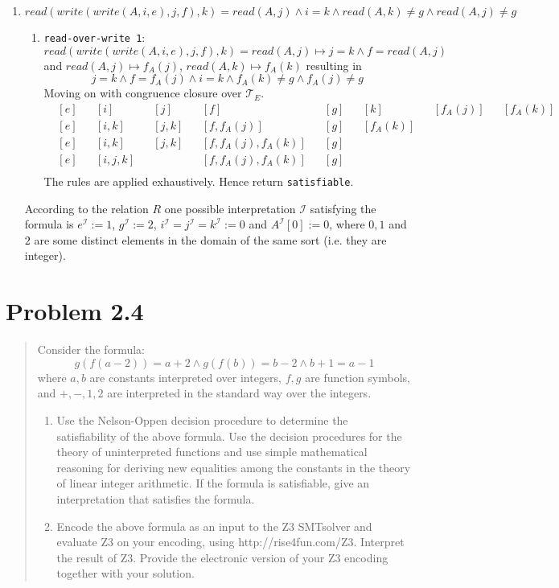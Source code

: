 \documentclass[11pt,a4paper]{article}
\begin{document}
\begin{enumerate}
\item $read(write(write(A, i, e), j, f ), k) = read(A, j) \land i = k \land read(A, k) \neq g \land read(A, j) \neq g$
\begin{enumerate}
\item \texttt{read-over-write 1}: \\
$read(write(write(A, i, e), j, f ), k) = read(A, j) \mapsto j=k \land f = read(A, j)$ and $read(A,j) \mapsto f_A(j)$, $read(A,k) \mapsto f_A(k)$ resulting in 
\begin{equation*}
 j=k \land f = f_A(j) \land i = k \land f_A(k) \neq g \land f_A(j) \neq g
\end{equation*}
Moving on with congruence closure over $\mathcal{T}_E$.
\begin{align*}
&[e]& &[i]& &[j]& &[f]& &[g]& &[k]& &[f_A(j)]& &[f_A(k)]& \\  
&[e]& &[i,k]& &[j,k]& &[f,f_A(j)]& &[g]& &[f_A(k)]& && &&\\  
&[e]& &[i,k]& &[j,k]& &[f,f_A(j),f_A(k)]& &[g]& && && &&\\  
&[e]& &[i,j,k]& &&  &[f,f_A(j),f_A(k)]& &[g]& &&  &&\\  
\end{align*}
The rules are applied exhaustively. Hence return \texttt{satisfiable}.
\end{enumerate}
According to the relation $R$ one possible interpretation $\mathcal{I}$ satisfying the formula is 
$e^{\mathcal{I}}:=1$, $g^{\mathcal{I}}:=2$, $i^{\mathcal{I}}=j^{\mathcal{I}}=k^{\mathcal{I}}:=0$ and $A^{\mathcal{I}}[0]:=0$, where $0,1$ and $2$ are some distinct elements in the domain of the same sort (i.e. they are integer). 
\end{enumerate}


\section*{Problem 2.4}
\begin{quote}
Consider the formula:
\begin{equation*}
g(f (a - 2)) = a + 2 \land g(f (b)) = b - 2 \land b + 1 = a - 1
\end{equation*}
where $a, b$ are constants interpreted over integers, $f , g$ are function symbols, and $+, -, 1, 2$ are interpreted in the standard way over the integers.
\begin{enumerate}
\item 
Use the Nelson-Oppen decision procedure to determine the satisfiability of the above formula.
Use the decision procedures for the theory of uninterpreted functions and use simple mathematical reasoning for deriving new equalities among the constants in the theory of linear integer
arithmetic. If the formula is satisfiable, give an interpretation that satisfies the formula.

\item 
Encode the above formula as an input to the Z3 SMTsolver and evaluate Z3 on your encoding,
using http://rise4fun.com/Z3. Interpret the result of Z3. Provide the electronic version
of your Z3 encoding together with your solution.
\end{enumerate}
\end{quote}
\end{document}
